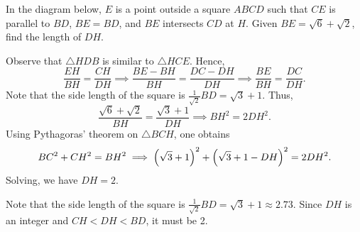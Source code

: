 \begin{question}[2]\label{Q::2022-O-1-19}
    In the diagram below, $E$ is a point outside a square $ABCD$ such that $CE$ is parallel to $BD$, $BE = BD$, and $BE$ intersects $CD$ at $H$. Given $BE = \sqrt6 + \sqrt2$, find the length of $DH$.

    \begin{center}
    \end{center}
\end{question}
\begin{solution}
    Observe that $\triangle HDB$ is similar to $\triangle HCE$. Hence, \[\frac{EH}{BH} = \frac{CH}{DH} \implies \frac{BE-BH}{BH} = \frac{DC-DH}{DH} \implies \frac{BE}{BH} = \frac{DC}{DH}.\] Note that the side length of the square is $\frac1{\sqrt2} BD = \sqrt3 + 1$. Thus, \[\frac{\sqrt6 + \sqrt2}{BH} = \frac{\sqrt3 + 1}{DH} \implies BH^2 = 2DH^2.\] Using Pythagoras' theorem on $\triangle BCH$, one obtains \[BC^2 + CH^2 = BH^2 \implies \left( \sqrt3 + 1 \right)^2 + \left( \sqrt3 + 1 - DH \right)^2 = 2DH^2.\] Solving, we have $DH = 2$.
\end{solution}
\begin{solution}
    Note that the side length of the square is $\frac1{\sqrt2} BD = \sqrt3 + 1 \approx 2.73$. Since $DH$ is an integer and $CH < DH < BD$, it must be 2.
\end{solution}

